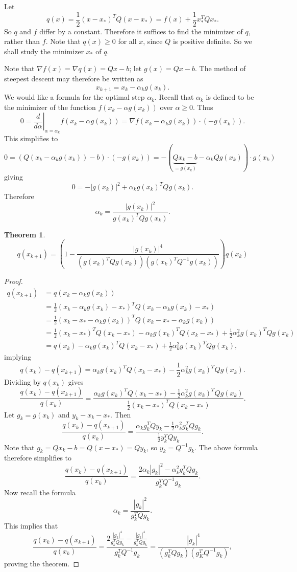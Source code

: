 \documentclass[11pt]{book}
\newtheorem{theorem}{Theorem}[subsection]
\begin{document}
Let 
\[
q(x) = \frac{1}{2}(x - x_*)^TQ(x-x_*) = f(x) + \frac{1}{2}x_*^TQx_*.
\]
So $q$ and $f$ differ by a constant. Therefore it suffices to find the minimizer of $q$, rather than $f$. Note that $q(x) \geq 0$ for all $x$, since $Q$ is positive definite. So we shall study the minimizer $x_*$ of $q$.

Note that $\nabla f(x) = \nabla q(x) = Qx - b$; let $g(x) = Qx - b$. The method of steepest descent may therefore be written as
\[
x_{k+1} = x_k - \alpha_k g(x_k).
\]
We would like a formula for the optimal step $\alpha_k$. Recall that $\alpha_k$ is defined to be the minimizer of the function $f(x_k - \alpha g(x_k))$ over $\alpha \geq 0$. Thus
\[
0 = \left. \frac{d}{d\alpha} \right|_{\alpha = \alpha_k} f(x_k - \alpha g(x_k)) = \nabla f(x_k - \alpha_k g(x_k)) \cdot (-g(x_k)).
\]
This simplifies to
\[
0 = (Q(x_k - \alpha_k g(x_k)) - b) \cdot (-g(x_k)) = -(\underbrace{Qx_k - b}_{=g(x_k)} - \alpha_k Q g(x_k)) \cdot g(x_k)
\]
giving
\[
0 = -|g(x_k)|^2 + \alpha_k g(x_k)^TQg(x_k).
\]
Therefore
\[
\tag{*}
\alpha_k = \frac{|g(x_k)|^2}{g(x_k)^TQg(x_k)}.
\]
\begin{theorem}
\[
q(x_{k+1}) = \left( 1 - \frac{|g(x_k)|^4}{(g(x_k)^T Q g(x_k))(g(x_k)^TQ^{-1}g(x_k))} \right)q(x_k)
\]
\end{theorem}
\begin{proof}
\begin{align*}
q(x_{k+1}) &= q(x_k - \alpha_k g(x_k)) \\
&= \frac{1}{2}(x_k - \alpha_k g(x_k) - x_*)^T Q (x_k - \alpha_k g(x_k) - x_*) \\
&= \frac{1}{2}(x_k - x_* - \alpha_k g(x_k))^T Q (x_k - x_* - \alpha_k g(x_k)) \\
&= \frac{1}{2}(x_k - x_*)^T Q (x_k - x_*) - \alpha_k g(x_k)^TQ(x_k - x_*) + \frac{1}{2} \alpha_k^2 g(x_k)^T Q g(x_k) \\
&= q(x_k) - \alpha_k g(x_k)^TQ(x_k - x_*) + \frac{1}{2} \alpha_k^2 g(x_k)^T Q g(x_k),
\end{align*}
implying
\[
q(x_k) - q(x_{k+1}) = \alpha_k g(x_k)^TQ(x_k - x_*) - \frac{1}{2} \alpha_k^2 g(x_k)^T Q g(x_k).
\]
Dividing by $q(x_k)$ gives
\[
\frac{q(x_k) - q(x_{k+1})}{q(x_k)} = \frac{\alpha_k g(x_k)^TQ(x_k - x_*) - \frac{1}{2} \alpha_k^2 g(x_k)^T Q g(x_k)}{\frac{1}{2}(x_k - x_*)^T Q (x_k - x_*)}.
\]
Let $g_k = g(x_k)$ and $y_k - x_k - x_*$. Then
\[
\frac{q(x_k) - q(x_{k+1})}{q(x_k)} = \frac{\alpha_k g_k^T Q y_k - \frac{1}{2} \alpha_k^2 g_k^T Q g_k}{\frac{1}{2} y_k^T Q y_k}.
\]
Note that $g_k = Qx_k - b = Q(x - x_*) = Qy_k$, so $y_k = Q^{-1}g_k$. The above formula therefore simplifies to
\[
\frac{q(x_k) - q(x_{k+1})}{q(x_k)} = \frac{2 \alpha_k |g_k|^2 - \alpha_k^2 g_k^TQg_k}{g_k^T Q^{-1} g_k}.
\]
Now recall the formula
\[
\tag{*}
\alpha_k = \frac{|g_k|^2}{g_k^TQg_k}.
\]
This implies that
\[
\frac{q(x_k) - q(x_{k+1})}{q(x_k)} = \frac{2 \frac{|g_k|^4}{g_k^T Q g_k} - \frac{|g_k|^4}{g_k^T Q g_k}}{g_k^T Q^{-1}g_k} = \frac{|g_k|^4}{(g_k^T Q g_k)(g_K^T Q^{-1} g_k)},
\]
proving the theorem.
\end{proof}
\end{document}
